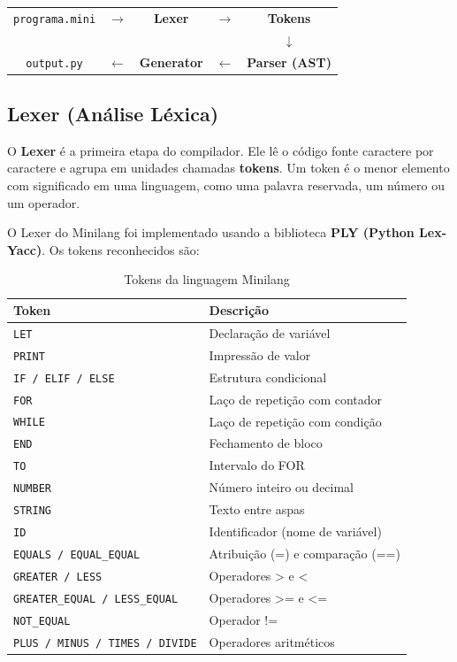 \documentclass[12pt, a4paper]{article}
\begin{document}
\begin{center}
\begin{tabular}{ccccc}
\texttt{programa.mini} & $\rightarrow$ & \textbf{Lexer} & $\rightarrow$ & \textbf{Tokens} \\
& & & & $\downarrow$ \\
\texttt{output.py} & $\leftarrow$ & \textbf{Generator} & $\leftarrow$ & \textbf{Parser (AST)} \\
\end{tabular}
\end{center}

\subsection{Lexer (Análise Léxica)}

O \textbf{Lexer} é a primeira etapa do compilador. Ele lê o código fonte caractere por caractere
e agrupa em unidades chamadas \textbf{tokens}. Um token é o menor elemento com significado
em uma linguagem, como uma palavra reservada, um número ou um operador.

O Lexer do Minilang foi implementado usando a biblioteca \textbf{PLY (Python Lex-Yacc)}.
Os tokens reconhecidos são:

\begin{table}[h]
\centering
\begin{tabular}{@{}ll@{}}
\toprule
\textbf{Token} & \textbf{Descrição} \\
\midrule
\texttt{LET} & Declaração de variável \\
\texttt{PRINT} & Impressão de valor \\
\texttt{IF / ELIF / ELSE} & Estrutura condicional \\
\texttt{FOR} & Laço de repetição com contador \\
\texttt{WHILE} & Laço de repetição com condição \\
\texttt{END} & Fechamento de bloco \\
\texttt{TO} & Intervalo do FOR \\
\texttt{NUMBER} & Número inteiro ou decimal \\
\texttt{STRING} & Texto entre aspas \\
\texttt{ID} & Identificador (nome de variável) \\
\texttt{EQUALS / EQUAL\_EQUAL} & Atribuição (=) e comparação (==) \\
\texttt{GREATER / LESS} & Operadores \textgreater{} e \textless{} \\
\texttt{GREATER\_EQUAL / LESS\_EQUAL} & Operadores \textgreater{}= e \textless{}= \\
\texttt{NOT\_EQUAL} & Operador != \\
\texttt{PLUS / MINUS / TIMES / DIVIDE} & Operadores aritméticos \\
\bottomrule
\end{tabular}
\caption{Tokens da linguagem Minilang}
\end{table}
\end{document}
